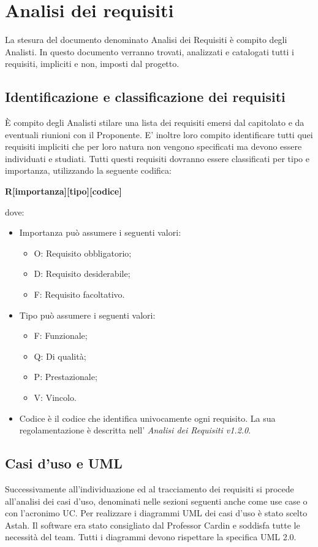 \newpage
\section{Analisi dei requisiti}
\label{7.0}
La stesura del documento denominato Analisi dei Requisiti è compito degli Analisti. 
In questo documento verranno trovati, analizzati e catalogati tutti i requisiti, impliciti e non, imposti dal progetto.

\subsection{Identificazione e classificazione dei requisiti}
\label{7.1}
È compito degli Analisti stilare una lista dei requisiti emersi dal capitolato e da eventuali riunioni con il Proponente. E' inoltre loro compito identificare tutti quei requisiti impliciti che per loro natura non vengono specificati ma devono essere individuati e studiati. Tutti questi requisiti dovranno essere classificati per tipo e importanza, utilizzando la seguente codifica:
\begin{center}
\textbf{R[importanza][tipo][codice]}
\end{center}
dove:
\begin{itemize}
\item Importanza può assumere i seguenti valori:
	\begin{itemize}
	\item O: Requisito obbligatorio;
	\item D: Requisito desiderabile;
	\item F: Requisito facoltativo.
	\end{itemize}
\item Tipo può assumere i seguenti valori:
	\begin{itemize}
	\item F: Funzionale;
	\item Q: Di qualità;
	\item P: Prestazionale;
	\item V: Vincolo.
	\end{itemize}
\item Codice è il codice che identifica univocamente ogni requisito. La sua regolamentazione è descritta nell' \emph{Analisi dei Requisiti v1.2.0}.
\end{itemize}

\subsection{Casi d’uso e UML}
\label{7.2}
Successivamente all'individuazione ed al tracciamento dei requisiti si procede all'analisi dei casi d'uso, denominati nelle sezioni seguenti anche come use case o con l'acronimo UC.
Per realizzare i diagrammi UML dei casi d'uso è stato scelto Astah. Il software era stato consigliato dal Professor Cardin e soddisfa tutte le necessità del team.
Tutti i diagrammi devono rispettare la specifica UML 2.0.

